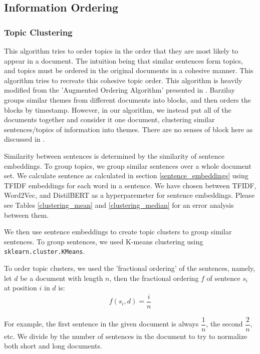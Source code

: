 \subsection{Information Ordering}

\subsubsection{Topic Clustering}

This algorithm tries to order topics in the order that they are most likely to appear in a document. The intuition being that similar sentences form topics, and topics must be ordered in the original documents in a cohesive manner. This algorithm tries to recreate this cohesive topic order. This algorithm is heavily modified from the 'Augmented Ordering Algorithm' presented in \citet{barzilay_2002}. Barzilay groups similar themes from different documents into blocks, and then orders the blocks by timestamp. However, in our algorithm, we instead put all of the documents together and consider it one document, clustering similar sentences/topics of information into themes. There are no senses of block here as discussed in \citet{barzilay_2002}.

Similarity between sentences is determined by the similarity of sentence embeddings. To group topics, we group similar sentences over a whole document set. We calculate sentence as calculated in section \ref{sentence_embeddings} using TFIDF embeddings for each word in a sentence. We have chosen between TFIDF, Word2Vec, and DistilBERT as a hyperparemeter for sentence embeddings. Please see Tables \ref{clustering_mean} and \ref{clustering_median} for an error analysis between them.

We then use sentence embeddings to create topic clusters to group similar sentences. To group sentences, we used K-means clustering using \texttt{sklearn.cluster.KMeans}. 

To order topic clusters, we used the 'fractional ordering' of the sentences, namely, let $d$ be a document with length $n$, then the fractional ordering $f$ of sentence $s_i$ at position $i$ in $d$ is:
\begin{align}
    f(s_i, d) = \dfrac{i}{n}
\end{align}

For example, the first sentence in the given document is always $\dfrac{1}{n}$, the second $\dfrac{2}{n}$, etc. We divide by the number of sentences in the document to try to normalize both short and long documents. 

